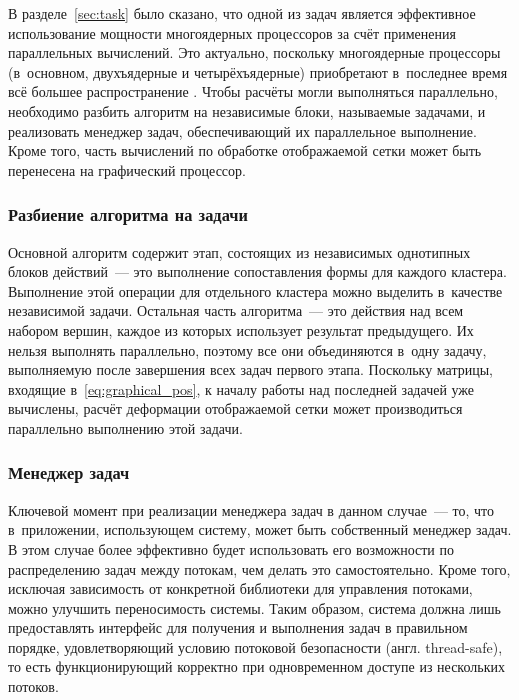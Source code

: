 \documentclass[a4paper, 14pt, titlepage]{extarticle}
\newcommand{\eng}[1]{{\English #1}}
\begin{document}
      В разделе~\ref{sec:task} было сказано, что одной из задач является эффективное использование
      мощности многоядерных процессоров за счёт применения параллельных вычислений.
      Это актуально, поскольку многоядерные процессоры (в~основном, двухъядерные и четырёхъядерные)
      приобретают в~последнее время всё большее распространение \cite{steam-hardware}.
      Чтобы расчёты могли выполняться параллельно, необходимо разбить алгоритм на независимые
      блоки, называемые задачами, и реализовать менеджер задач, обеспечивающий их параллельное
      выполнение. Кроме того, часть вычислений по обработке отображаемой сетки может быть перенесена
      на графический процессор.

      \subsubsection{Разбиение алгоритма на задачи}

        Основной алгоритм содержит этап, состоящих из независимых однотипных блоков
        действий~--- это выполнение сопоставления формы для каждого кластера. Выполнение этой
        операции для отдельного кластера можно выделить в~качестве независимой задачи. Остальная
        часть алгоритма~--- это действия над всем набором вершин, каждое из которых использует
        результат предыдущего. Их нельзя выполнять параллельно, поэтому все они объединяются в~одну
        задачу, выполняемую после завершения всех задач первого этапа. Поскольку матрицы, входящие
        в~\eqref{eq:graphical_pos}, к началу работы над последней задачей уже вычислены,
        расчёт деформации отображаемой сетки может производиться параллельно выполнению этой задачи.

      \subsubsection{Менеджер задач}

        Ключевой момент при реализации менеджера задач в данном случае~--- то, что в~приложении,
        использующем систему, может быть собственный менеджер задач. В этом случае более эффективно
        будет использовать его возможности по распределению задач между потокам, чем делать это
        самостоятельно. Кроме того, исключая зависимость от конкретной библиотеки для управления
        потоками, можно улучшить переносимость системы. Таким образом, система должна лишь
        предоставлять интерфейс для получения и выполнения задач в правильном порядке,
        удовлетворяющий условию потоковой безопасности (англ. \eng{thread-safe}), то есть
        функционирующий корректно при одновременном доступе из нескольких потоков.
\end{document}

